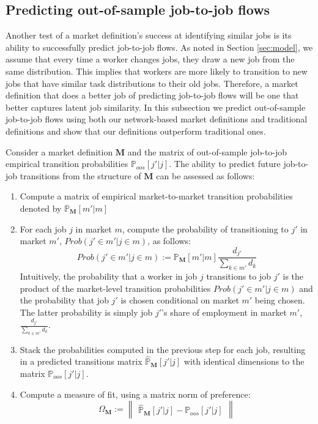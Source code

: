 \documentclass[12pt]{article}
\theoremstyle{definition}
\theoremstyle{plain}
\begin{document}
\subsection{Predicting out-of-sample job-to-job flows}

Another test of a market definition's success at identifying similar jobs is its ability to successfully predict job-to-job flows. As noted in Section \ref{sec:model}, we assume that every time a worker changes jobs, they draw a new job from the same distribution. This implies that workers are more likely to transition to new jobs that have similar task distributions to their old jobs.  Therefore, a market definition that does a better job of predicting job-to-job flows will be one that better captures latent job similarity. In this subsection we predict out-of-sample job-to-job flows using both our network-based market definitions and traditional definitions and show that our definitions outperform traditional ones.


Consider a market definition $\mathbf{M}$ and the matrix of out-of-sample job-to-job empirical transition probabilities $\mathbb{P}_{oos}[j'|j]$. The ability to predict future job-to-job transitions from the structure of $\mathbf{M}$ can be assessed as follows:

\begin{enumerate}
	\item Compute a matrix of empirical market-to-market transition probabilities denoted by $\mathbb{P}_{\mathbf{M}}[m'|m]$
	\item For each job $j$ in market $m$, compute the probability of transitioning to $j'$ in market $m'$, $Prob(j' \in m'|j \in m)$, as follows:
	\[Prob(j' \in m'|j \in m) := \mathbb{P}_{\mathbf{M}}[m'|m] \frac{d_{j'}}{\sum_{k\in m'} d_{k}} \]
	Intuitively, the probability that a worker in job $j$ transitions to job $j'$ is the product of the market-level transition probabilities $Prob(j' \in m'|j \in m)$ and the probability that job $j'$ is chosen conditional on market $m'$ being chosen. The latter probability is simply job $j'$'s share of employment in market $m'$, $ \frac{d_{j'}}{\sum_{k\in m'} d_{k}}$.
	\item Stack the probabilities computed in the previous step for each job, resulting in a predicted transitions matrix $\mathbb{\hat P}_{\mathbf{M}}[j'|j]$ with identical dimensions to the matrix $\mathbb{P}_{oos}[j'|j]$.
	\item Compute a measure of fit, using a matrix norm of preference:
	\[ \Omega_{\mathbf{M}} := \begin{Vmatrix}
		\mathbb{\hat P}_{\mathbf{M}}[j'|j] - \mathbb{P}_{oos}[j'|j]
	\end{Vmatrix} \]
\end{enumerate}
\end{document}
